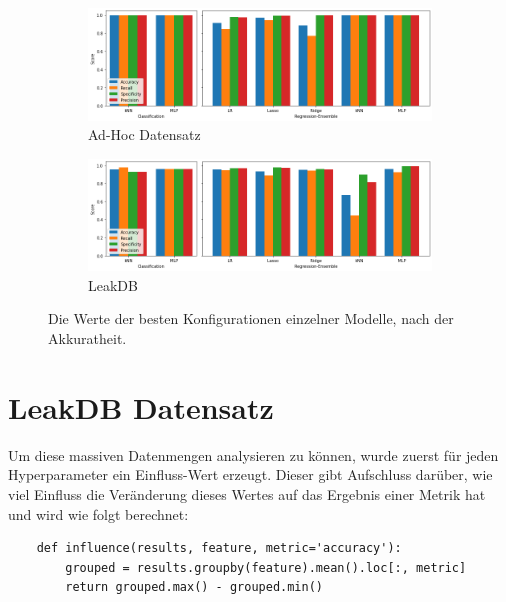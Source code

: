 \begin{figure}[h]
    \centering
    \begin{subfigure}{\textwidth}
        \includegraphics[width=1.0\textwidth]{res/res-best-adhoc}
        \caption{Ad-Hoc Datensatz\vspace{1em}}
        \label{fig:res-best-adhoc}
    \end{subfigure}
    \begin{subfigure}{\textwidth}
        \includegraphics[width=1.0\textwidth]{res/res-best-leakdb}
        \caption{LeakDB}
        \label{fig:res-best-leakdb}
    \end{subfigure}
    \caption{Die Werte der besten Konfigurationen einzelner Modelle, nach der Akkuratheit.}
\end{figure}

\section{LeakDB Datensatz}

Um diese massiven Datenmengen analysieren zu können, wurde zuerst für jeden Hyperparameter ein Einfluss-Wert
 erzeugt. Dieser gibt Aufschluss darüber, wie viel Einfluss die Veränderung dieses Wertes auf das Ergebnis
 einer Metrik hat und wird wie folgt berechnet:

\begin{verbatim}
    def influence(results, feature, metric='accuracy'):
        grouped = results.groupby(feature).mean().loc[:, metric]
        return grouped.max() - grouped.min()
\end{verbatim}

